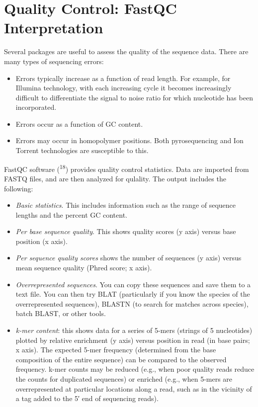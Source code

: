 \documentclass[
  letterpaper,
  DIV=11,
  numbers=noendperiod]{scrreprt}
\begin{document}
\section{Quality Control: FastQC
Interpretation}\label{quality-control-fastqc-interpretation}

Several packages are useful to assess the quality of the sequence data.
There are many types of sequencing errors:

\begin{itemize}
\item
  Errors typically increase as a function of read length. For example,
  for Illumina technology, with each increasing cycle it becomes
  increasingly difficult to differentiate the signal to noise ratio for
  which nucleotide has been incorporated.
\item
  Errors occur as a function of GC content.
\item
  Errors may occur in homopolymer positions. Both pyrosequencing and Ion
  Torrent technologies are susceptible to this.
\end{itemize}

FastQC software (\textsuperscript{18}) provides quality control
statistics. Data are imported from FASTQ files, and are then analyzed
for qulality. The output includes the following:

\begin{itemize}
\item
  \emph{Basic statistics}. This includes information such as the range
  of sequence lengths and the percent GC content.
\item
  \emph{Per base sequence quality}. This shows quality scores (y axis)
  versus base position (x axis).
\item
  \emph{Per sequence quality scores} shows the number of sequences (y
  axis) versus mean sequence quality (Phred score; x axis).
\item
  \emph{Overrepresented sequences}. You can copy these sequences and
  save them to a text file. You can then try BLAT (particularly if you
  know the species of the overrepresented sequences), BLASTN (to search
  for matches across species), batch BLAST, or other tools.
\item
  \emph{k-mer content}: this shows data for a series of 5-mers (strings
  of 5 nucleotides) plotted by relative enrichment (y axis) versus
  position in read (in base pairs; x axis). The expected 5-mer frequency
  (determined from the base composition of the entire sequence) can be
  compared to the observed frequency. k-mer counts may be reduced (e.g.,
  when poor quality reads reduce the counts for duplicated sequences) or
  enriched (e.g., when 5-mers are overrepresented at particular
  locations along a read, such as in the vicinity of a tag added to the
  5′ end of sequencing reads).
\end{itemize}
\end{document}
